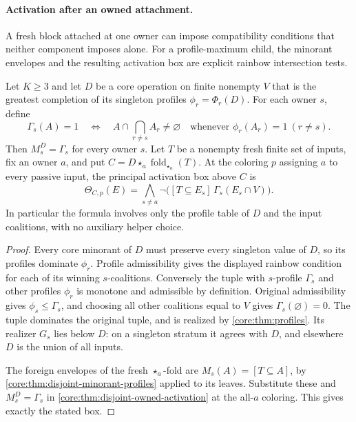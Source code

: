 \paragraph{Activation after an owned attachment.}
A fresh block attached at one owner can impose compatibility conditions
that neither component imposes alone. For a profile-maximum child, the
minorant envelopes and the resulting activation box are explicit rainbow
intersection tests.

\begin{theorem}
\label{core:thm:tagged-profile-activation}
Let $K\geq3$ and let $D$ be a core operation on finite nonempty $V$
that is the greatest completion of its singleton profiles $\phi_r=\Phi_r(D)$.
For each owner $s$, define
\[
 \Gamma_s(A)=1\quad\Longleftrightarrow\quad
 A\cap\bigcap_{r\ne s}A_r\ne\varnothing
 \quad\text{whenever }\phi_r(A_r)=1\ (r\ne s).
\]
Then $M_s^D=\Gamma_s$ for every owner $s$.
Let $T$ be a nonempty fresh finite set of inputs, fix an owner $a$, and
put $C=D\star_a\operatorname{fold}_{\star_a}(T)$.
At the coloring $p$ assigning $a$ to every passive input, the principal
activation box above $C$ is
\[
 \Theta_{C,p}(E)=
 \bigwedge_{s\ne a}\neg\bigl([T\subseteq E_s]\,
                         \Gamma_s(E_s\cap V)\bigr).
\]
In particular the formula involves only the profile table of $D$ and
the input coalitions, with no auxiliary helper choice.
\end{theorem}
\begin{proof}
Every core minorant of $D$ must preserve every singleton value of $D$, so its
profiles dominate $\phi_r$. Profile admissibility gives the displayed
rainbow condition for each of its winning $s$-coalitions.
Conversely the tuple with $s$-profile $\Gamma_s$ and other profiles
$\phi_r$ is monotone and admissible by definition. Original admissibility
gives $\phi_s\leq\Gamma_s$, and choosing all other coalitions equal
to $V$ gives $\Gamma_s(\varnothing)=0$. The tuple dominates the
original tuple, and is realized by \cref{core:thm:profiles}.
Its realizer $G_s$ lies below $D$: on a singleton stratum it agrees
with $D$, and elsewhere $D$ is the union of all inputs.

The foreign envelopes of the fresh $\star_a$-fold are
$M_s(A)=[T\subseteq A]$, by \cref{core:thm:disjoint-minorant-profiles}
applied to its leaves. Substitute these and $M_s^D=\Gamma_s$ in
\cref{core:thm:disjoint-owned-activation} at the all-$a$ coloring.
This gives exactly the stated box.
\end{proof}

